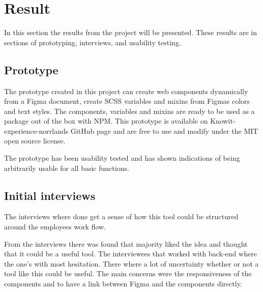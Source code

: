 \section{Result}


In this section the results from the project will be presented. These results are in sections of prototyping, interviews, and usability testing.

\subsection{Prototype}%
\label{sub:Prototype}
The prototype created in this project can create web components dynamically from a Figma document, create SCSS variables and mixins from Figmas colors and text styles. The components, variables and mixins are ready to be used as a package out of the box with NPM. This prototype is available on Knowit-experience-norrlands GitHub page and are free to use and modify under the MIT open source license.

The prototype has been usability tested and has shown indications of being arbitrarily usable for all basic functions.

\subsection{Initial interviews}%
\label{sub:Initial interviews}
The interviews where done get a sense of how this tool could be structured around the employees work flow.

From the interviews there was found that majority liked the idea and thought that it could be a useful tool. The interviewees that worked with back-end where the one's with most hesitation. There where a lot of uncertainty whether or not a tool like this could be useful. The main concerns were the responsiveness of the components and to have a link between Figma and the components directly.

